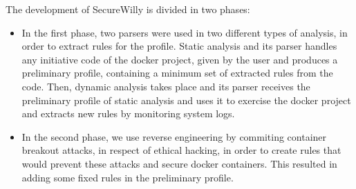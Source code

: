 The development of SecureWilly is divided in two phases:
\begin{itemize}
\item In the first phase, two parsers were used in two different types of analysis, in order to extract rules for the profile. Static analysis and its parser handles any initiative code of the docker project, given by the user and produces a preliminary profile, containing a minimum set of extracted rules from the code. Then, dynamic analysis takes place and its parser receives the preliminary profile of static analysis and uses it to exercise the docker project and extracts new rules by monitoring system logs.
\item In the second phase, we use reverse engineering by commiting container breakout attacks, in respect of ethical hacking, in order to create rules that would prevent these attacks and secure docker containers. This resulted in adding some fixed rules in the preliminary profile.
\end{itemize}


